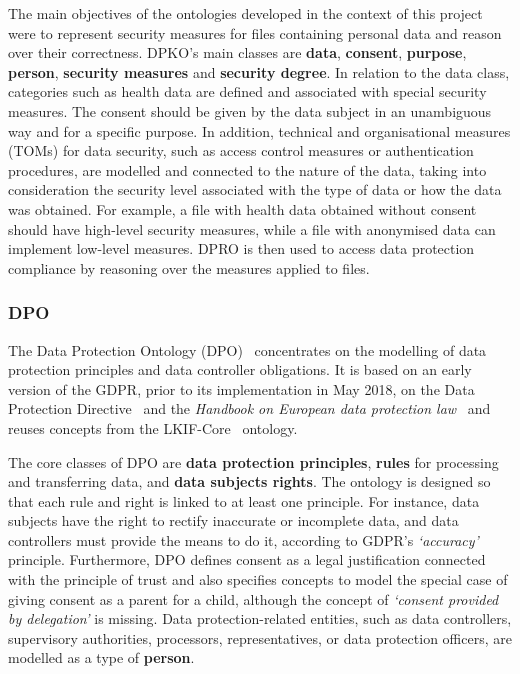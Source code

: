The main objectives of the ontologies developed in the context of this project were to represent security measures for files containing personal data and reason over their correctness.
DPKO's main classes are \textbf{data}, \textbf{consent}, \textbf{purpose}, \textbf{person}, \textbf{security measures} and \textbf{security degree}.
In relation to the data class, categories such as health data are defined and associated with special security measures. 
The consent should be given by the data subject in an unambiguous way and for a specific purpose.
In addition, technical and organisational measures (TOMs) for data security, such as access control measures or authentication procedures, are modelled and connected to the nature of the data, taking into consideration the security level associated with the type of data or how the data was obtained. 
For example, a file with health data obtained without consent should have high-level security measures, while a file with anonymised data can implement low-level measures.
DPRO is then used to access data protection compliance by reasoning over the measures applied to files.

\subsubsection{DPO}
\label{sec:dpo}

The Data Protection Ontology (DPO)~\citep{bartolini_reconciling_2015,otake_using_2017} concentrates on the modelling of data protection principles and data controller obligations. It is based on an early version of the GDPR, prior to its implementation in May 2018, on the Data Protection Directive~\citeyearpar{noauthor_directive_1995} and the \textit{Handbook on European data protection law}~\citep{european_union_agency_for_fundamental_rights_and_council_of_europe_handbook_2018} and reuses concepts from the LKIF-Core~\citep{hoekstra_lkif_2007} ontology.

The core classes of DPO are \textbf{data protection principles}, \textbf{rules} for processing and transferring data, and \textbf{data subjects rights}.
The ontology is designed so that each rule and right is linked to at least one principle.
For instance, data subjects have the right to rectify inaccurate or incomplete data, and data controllers must provide the means to do it, according to GDPR's \textit{`accuracy'} principle.
Furthermore, DPO defines consent as a legal justification connected with the principle of trust and also specifies concepts to model the special case of giving consent as a parent for a child, although the concept of \textit{`consent provided by delegation'} is missing.
Data protection-related entities, such as data controllers, supervisory authorities, processors, representatives, or data protection officers, are modelled as a type of \textbf{person}.

